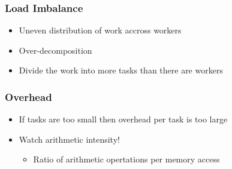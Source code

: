 \documentclass{beamer}
\begin{document}
\begin{frame}
	\frametitle{Load Imbalance}
	\begin{itemize}
	\item Uneven distribution of work accross workers
	\item Over-decomposition
	\item Divide the work into more tasks than there  are workers
	\end{itemize}
\end{frame}


\begin{frame}
	\frametitle{Overhead}
	\begin{itemize}
	\item If tasks are too small then overhead per task is too large
	\item Watch arithmetic intensity!
	\begin{itemize}
	\item Ratio of arithmetic opertations per memory access
	\end{itemize}
	\end{itemize}
	
\end{frame}


    
\end{document}
